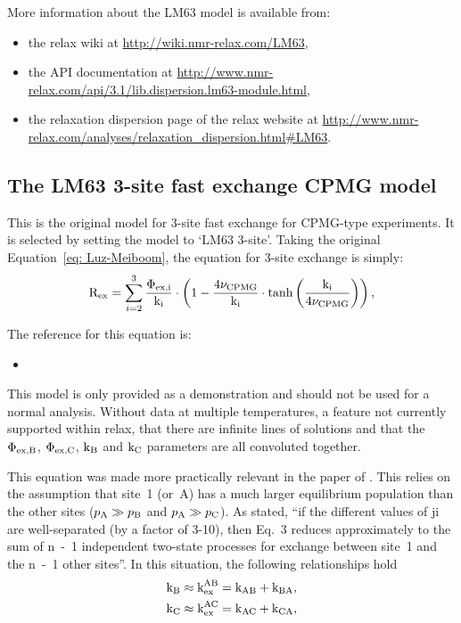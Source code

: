 More information about the LM63 model is available from:
\begin{itemize}
  \item the relax wiki at \url{http://wiki.nmr-relax.com/LM63},
  \item the API documentation at \url{http://www.nmr-relax.com/api/3.1/lib.dispersion.lm63-module.html},
  \item the relaxation dispersion page of the relax website at \url{http://www.nmr-relax.com/analyses/relaxation\_dispersion.html#LM63}.
\end{itemize}



\subsection{The LM63 3-site fast exchange CPMG model}
\label{sect: dispersion: LM63 3-site model}

This is the original \citet{LuzMeiboom63} model for 3-site fast exchange for CPMG-type experiments.
It is selected by setting the model to `LM63 3-site'.
Taking the original Equation~\ref{eq: Luz-Meiboom}, the equation for 3-site exchange is simply:
\begin{equation}
    \mathrm{R}_\textrm{ex} = \sum_{i=2}^3 \frac{\Phi_\textrm{ex,i}}{\textrm{k}_\textrm{i}} \cdot \left( 1 - \frac{4\nu_\textrm{CPMG}}{\textrm{k}_\textrm{i}} \cdot \tanh \left( \frac{\textrm{k}_\textrm{i}}{4\nu_\textrm{CPMG}} \right) \right) ,
\end{equation}

The reference for this equation is:
\begin{itemize}
  \item {}
\end{itemize}

This model is only provided as a demonstration and should not be used for a normal analysis.
Without data at multiple temperatures, a feature not currently supported within relax, that there are infinite lines of solutions and that the $\Phi_\textrm{ex,B}$, $\Phi_\textrm{ex,C}$, $\textrm{k}_\textrm{B}$ and $\textrm{k}_\textrm{C}$ parameters are all convoluted together.

This equation was made more practically relevant in the paper of \citet{OConnell09}.
This relies on the assumption that site~1 (or~A) has a much larger equilibrium population than the other sites ($p_\textrm{A} \gg p_\textrm{B}$ and $p_\textrm{A} \gg p_\textrm{C}$).
As stated, ``if the different values of ji are well-separated (by a factor of 3-10), then Eq.~3 reduces approximately to the sum of n~-~1 independent two-state processes for exchange between site~1 and the n~-~1 other sites''.
In this situation, the following relationships hold
\begin{subequations}
\begin{align}
    &\textrm{k}_\textrm{B} \approx \textrm{k}_\textrm{ex}^\textrm{AB} = \textrm{k}_\textrm{AB} + \textrm{k}_\textrm{BA} , \\
    &\textrm{k}_\textrm{C} \approx \textrm{k}_\textrm{ex}^\textrm{AC} = \textrm{k}_\textrm{AC} + \textrm{k}_\textrm{CA} ,
\end{align}
\end{subequations}

